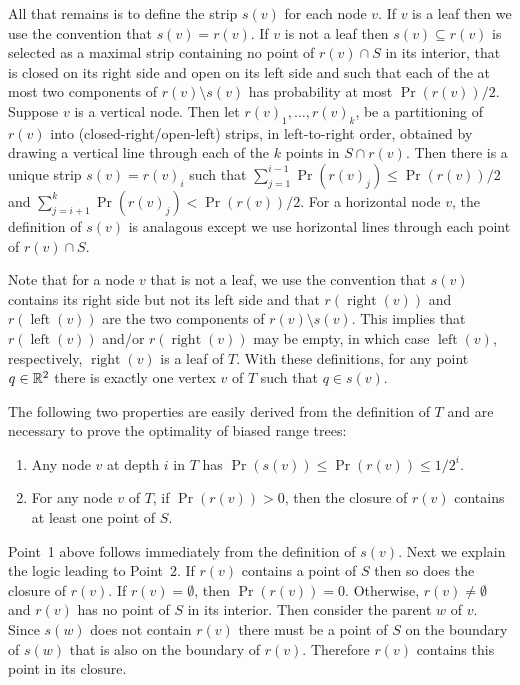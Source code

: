 \documentclass{patmorin}
\DeclareMathOperator{\lft}{left}
\DeclareMathOperator{\rght}{right}
\begin{document}
All that remains is to define the strip $s(v)$ for each node $v$. If $v$
is a leaf then we use the convention that $s(v)=r(v)$.  If $v$ is not a
leaf then $s(v)\subseteq r(v)$ is selected as a maximal strip containing
no point of $r(v)\cap S$ in its interior, that is closed on its right
side and open on its left side and such that each of the at most two
components of $r(v)\setminus s(v)$ has probability at most $\Pr(r(v))/2$.
Suppose $v$ is a vertical node.  Then let $r(v)_1,\ldots,r(v)_k$,
be a partitioning of $r(v)$ into (closed-right/open-left) strips,
in left-to-right order, obtained by drawing a vertical line through
each of the $k$ points in $S\cap r(v)$.  Then there is a unique strip
$s(v)=r(v)_i$ such that $\sum_{j=1}^{i-1} \Pr(r(v)_j) \le \Pr(r(v))/2$
and $\sum_{j=i+1}^{k} \Pr(r(v)_j) < \Pr(r(v))/2$.  For a horizontal
node $v$, the definition of $s(v)$ is analagous except we use horizontal
lines through each point of $r(v)\cap S$.

Note that for a node $v$ that is not a leaf, we use the convention
that $s(v)$ contains its right side but not its left side and that
$r(\rght(v))$ and $r(\lft(v))$ are the two components of $r(v)\setminus
s(v)$.  This implies that $r(\lft(v))$ and/or $r(\rght(v))$ may be
empty, in which case $\lft(v)$, respectively, $\rght(v)$ is a leaf of
$T$.  With these definitions, for any point $q\in \mathbb{R}^2$ there is
exactly one vertex $v$ of $T$ such that $q\in s(v)$.

The following two properties are easily derived from the definition of
$T$ and are necessary to prove the optimality of biased range trees:
\begin{enumerate}

\item Any node $v$ at depth $i$ in $T$ has $\Pr(s(v))\le \Pr(r(v))\le 1/2^i$.

\item For any node $v$ of $T$, if $\Pr(r(v)) > 0$, then the closure of
$r(v)$ contains at least one point of $S$.
\end{enumerate}

Point~1 above follows immediately from the definition of $s(v)$. Next we
explain the logic leading to Point~2.  If $r(v)$ contains a point of $S$
then so does the closure of $r(v)$.   If $r(v)=\emptyset$, then $\Pr(r(v))
= 0$.  Otherwise, $r(v) \neq \emptyset$ and $r(v)$ has no point of $S$ in
its interior.  Then consider the parent $w$ of $v$.  Since $s(w)$ does not
contain $r(v)$ there must be a point of $S$ on the boundary of $s(w)$ that
is also on the boundary of $r(v)$.  Therefore $r(v)$ contains this point in
its closure.
\end{document}
